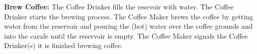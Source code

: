 \documentclass[letterpaper]{article}
\begin{document}
\noindent
\textbf{Brew Coffee:  }The Coffee Drinker fills the resevoir with
water.  The Coffee Drinker starts the brewing process.
The Coffee Maker brews the coffee by getting water from
the reservoir and pouring the (hot) water over the coffee grounds and
into the carafe until the reservoir is empty.  The Coffee Maker 
signals the Coffee Drinker(s) it is finished brewing coffee.
\end{document}
